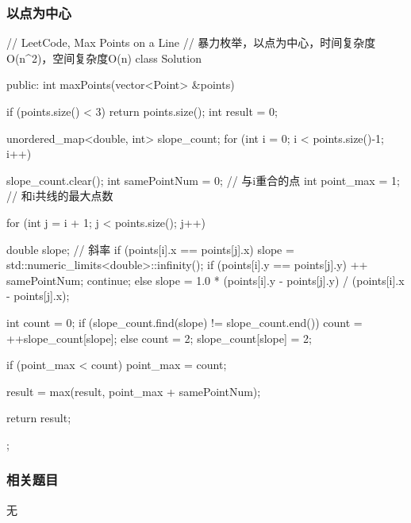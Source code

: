 \subsubsection{以点为中心}
\begin{Code}
// LeetCode, Max Points on a Line
// 暴力枚举，以点为中心，时间复杂度O(n^2)，空间复杂度O(n)
class Solution {
public:
    int maxPoints(vector<Point> &points) {
        if (points.size() < 3) return points.size();
        int result = 0;

        unordered_map<double, int> slope_count;
        for (int i = 0; i < points.size()-1; i++) {
            slope_count.clear();
            int samePointNum = 0; // 与i重合的点
            int point_max = 1;    // 和i共线的最大点数

            for (int j = i + 1; j < points.size(); j++) {
                double slope; // 斜率
                if (points[i].x == points[j].x) {
                    slope = std::numeric_limits<double>::infinity();
                    if (points[i].y == points[j].y) {
                        ++ samePointNum;
                        continue;
                    }
                } else {
                    slope = 1.0 * (points[i].y - points[j].y) / 
                        (points[i].x - points[j].x);
                }

                int count = 0;
                if (slope_count.find(slope) != slope_count.end())
                    count = ++slope_count[slope];
                else {
                    count = 2;
                    slope_count[slope] = 2;
                }

                if (point_max < count) point_max = count;
            }
            result = max(result, point_max + samePointNum);
        }
        return result;
    }
};
\end{Code}


\subsubsection{相关题目}
\begindot
\item 无
\myenddot
